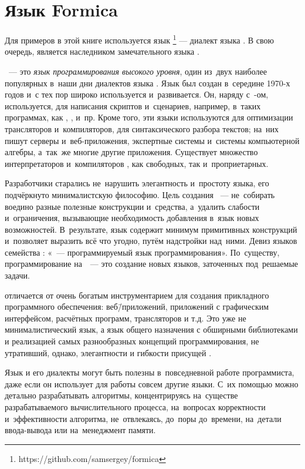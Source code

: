 \section[2]{Язык Formica}%
Для примеров в этой книге используется язык \FLP{}\footnote{https://github.com/samsergey/formica} --- диалект языка . В свою очередь,  является наследником замечательного языка .

~--- это \emph{язык программирования высокого уровня}, один из~двух наиболее популярных в~наши дни диалектов языка \Lisp. Язык  был создан в~середине 1970-х годов и~с тех пор широко используется и~развивается. Он, наряду с~\Lisp-ом, используется, для написания скриптов и~сценариев, например, в~таких программах, как , ,  и~пр. Кроме того, эти языки используются для оптимизации трансляторов и~компиляторов, для синтаксического разбора текстов; на~них пишут серверы и~веб-приложения, экспертные системы и~системы компьютерной алгебры, а~так~же многие другие приложения. Существует множество интерпретаторов и~компиляторов , как свободных, так и~проприетарных.

Разработчики  старались не~нарушить элегантность и~простоту языка, его подчёркнуто минималистскую философию. Цель создания ~--- не~собирать воедино разные полезные конструкции и~средства, а~удалить слабости и~ограничения, вызывающие необходимость добавления в~язык новых возможностей. В~результате, язык содержит минимум примитивных конструкций и~позволяет выразить всё что угодно, путём надстройки над~ними. Девиз языков семейства \Lisp: «\Lisp~--- программируемый язык программирования». По~существу, программирование на~~--- это создание новых языков, заточенных под~решаемые задачи.

 отличается от  очень богатым инструментарием для создания прикладного программного обеспечения: веб\=/приложений, приложений с графическим интерфейсом, расчётных программ, трансляторов и т.д. Это уже не минималистический язык, а язык общего назначения с обширными библиотеками и реализацией самых разнообразных концепций программирования, не утративший, однако, элегантности и гибкости присущей .

Язык  и его диалекты могут быть полезны в~повседневной работе программиста, даже если он использует для работы совсем другие языки. С~их помощью можно детально разрабатывать алгоритмы, концентрируясь на~существе разрабатываемого вычислительного процесса, на~вопросах корректности и~эффективности алгоритма, не~отвлекаясь, до~поры до~времени, на~детали ввода-вывода или на~менеджмент памяти.

